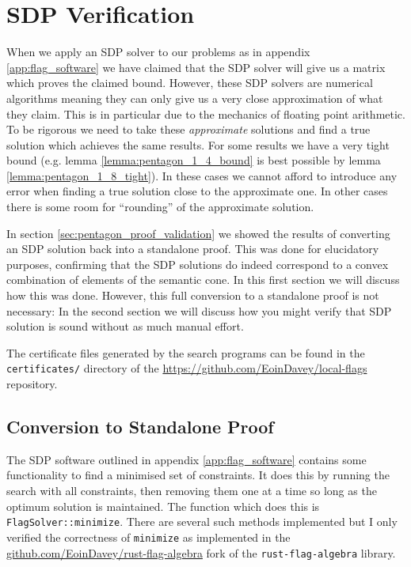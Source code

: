 \chapter{SDP Verification}
\label{app:sdp_verification}

When we apply an SDP solver to our problems as in appendix \ref{app:flag_software}
we have claimed that the SDP solver will give us a matrix which proves the claimed bound.
However, these SDP solvers are numerical algorithms meaning they can only give us a very
close approximation of what they claim. This is in particular due to the mechanics of
floating point arithmetic. To be rigorous we need to take these \textit{approximate}
solutions and find a true solution which achieves the same results.
For some results we have a very tight bound (e.g. lemma \ref{lemma:pentagon_1_4_bound}
is best possible by lemma \ref{lemma:pentagon_1_8_tight}). In these cases we cannot afford
to introduce any error when finding a true solution close to the approximate one. In
other cases there is some room for ``rounding'' of the approximate solution.

In section \ref{sec:pentagon_proof_validation} we showed the results of converting an
SDP solution back into a standalone proof. This was done for elucidatory purposes,
confirming that the SDP solutions do indeed correspond to a convex combination of elements
of the semantic cone. In this first section we will discuss how this was done.
However, this full conversion to a standalone proof is not necessary: In the second
section we will discuss how you might verify that SDP solution is sound without as much
manual effort.

The certificate files generated by the search programs can be found in the\\
\verb|certificates/| directory of the \url{https://github.com/EoinDavey/local-flags}
repository.

\section*{Conversion to Standalone Proof}

The SDP software outlined in appendix \ref{app:flag_software} contains some
functionality to find a minimised set of constraints. It does this by
running the search with all constraints, then removing them one at a time so long as
the optimum solution is maintained. The function which does this is
\verb|FlagSolver::minimize|. There are several such methods implemented but I
only verified the correctness of \verb|minimize| as implemented in the
\url{github.com/EoinDavey/rust-flag-algebra} fork of the \verb|rust-flag-algebra|
library.

